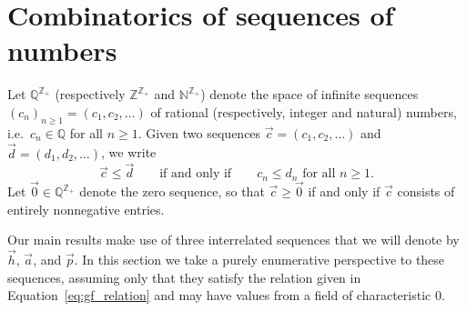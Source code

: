 \documentclass[11pt]{amsart}
\theoremstyle{definition}
\numberwithin{equation}{section}
\def\NN{{\mathbb N}}
\def\ZZ{{\mathbb Z}}
\def\QQ{{\mathbb Q}}
\newcommand{\lucas}[1]{\todo[size=\tiny,color=red!50]{#1 \\ \hfill --- Lucas}}
\begin{document}
%



\newpage

\section{Combinatorics of sequences of numbers}
\label{sec:SequencePrelims}

Let $\QQ^{\ZZ_+}$ (respectively $\ZZ^{\ZZ_+}$ and $\NN^{\ZZ_+}$) denote the space of infinite sequences
$(c_{n})_{n \ge 1} = (c_{1}, c_{2}, \ldots)$ of rational (respectively, integer and natural) numbers,
i.e.~$c_{n} \in \QQ$ for all $n \ge 1$.
Given two sequences $\vec{c} = (c_{1}, c_{2}, \ldots)$ and $\vec{d} = (d_{1}, d_{2}, \ldots)$, we write
\[
\vec{c} \le \vec{d} 
\qquad\text{if and only if}\qquad
\text{$c_{n} \le d_{n}$ for all $n \ge 1$}.
\]
Let $\vec{0} \in \QQ^{\ZZ_+}$ denote the zero sequence, so that $\vec{c} \ge \vec{0}$
if and only if $\vec{c}$ consists of entirely nonnegative entries.

Our main results make use of three interrelated sequences that we will denote by $\vec{h}$, $\vec{a}$, and $\vec{p}$.  
In this section we take a purely enumerative perspective to these sequences, assuming only that they satisfy the relation given in Equation~\eqref{eq:gf_relation} and may have values from a field of characteristic $0$.  
\end{document}
